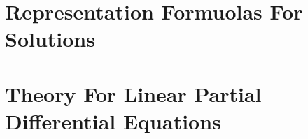 \documentclass[leqno]{mynotes}
\begin{document}
	
	\maketitle
	
	\tableofcontents
	
	\newpage	
	
	

	\part{Representation Formuolas For Solutions}
%	

	\part{Theory For Linear Partial Differential Equations}
	
	

%	
%	
%	
	
%	
%	
%	
	
\end{document}
